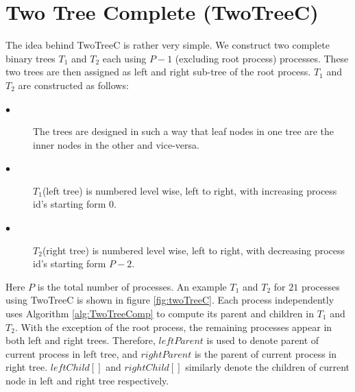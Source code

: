 \documentclass[sigplan,review,anonymous]{acmart}\settopmatter{printfolios=true,printccs=false,printacmref=false}
\begin{document}


\section{Two Tree Complete (TwoTreeC)}\label{sec:TwoTreeC}
The idea behind TwoTreeC is rather very simple. We construct two complete binary trees $T_1$ and $T_2$ each using $P-1$ (excluding root process) processes. These two trees are then assigned as left and right sub-tree of the root process. $T_1$ and $T_2$ are constructed as follows:
\begin{description}
    \item[$\bullet$]The trees are designed in such a way that leaf nodes in one tree are the inner nodes in the other and vice-versa.
    \item[$\bullet$]$T_1$(left tree) is numbered level wise, left to right, with increasing process id's starting form $0$.
    \item[$\bullet$]$T_2$(right tree) is numbered level wise, left to right, with decreasing process id's starting form $P-2$.
\end{description}
Here $P$ is the total number of processes. An example $T_1$ and $T_2$ for $21$ processes using TwoTreeC is shown in figure \ref{fig:twoTreeC}. Each process independently uses Algorithm \ref{alg:TwoTreeComp} to compute its parent and children in $T_1$ and $T_2$. With the exception of the root process, the remaining processes appear in both left and right trees. Therefore, $leftParent$ is used to denote parent of current process in left tree, and $rightParent$ is the parent of current process in right tree. $leftChild[]$ and $rightChild[]$ similarly denote the children of current node in left and right tree respectively. 
 
\end{document}
